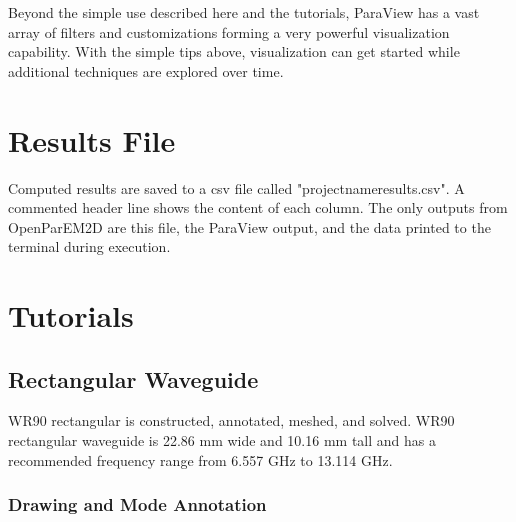 \documentclass[titlepage]{article}
\renewcommand\_{\textunderscore\linebreak[1]}
\begin{document}
Beyond the simple use described here and the tutorials, ParaView has a vast array of filters and customizations forming a very powerful visualization capability. With the simple tips above, visualization can get started while additional techniques are explored over time.

\section{Results File}

Computed results are saved to a csv file called "project\_name\_results.csv".  A commented header line shows the content of each column.  The only outputs from OpenParEM2D are this file, the ParaView output, and the data printed to the terminal during execution.

\section{Tutorials}

\subsection{Rectangular Waveguide}
WR90 rectangular is constructed, annotated, meshed, and solved.  WR90 rectangular waveguide is 22.86 mm wide and 10.16 mm tall and has a recommended frequency range from 6.557 GHz to 13.114 GHz.

\subsubsection{Drawing and Mode Annotation}
\end{document}
